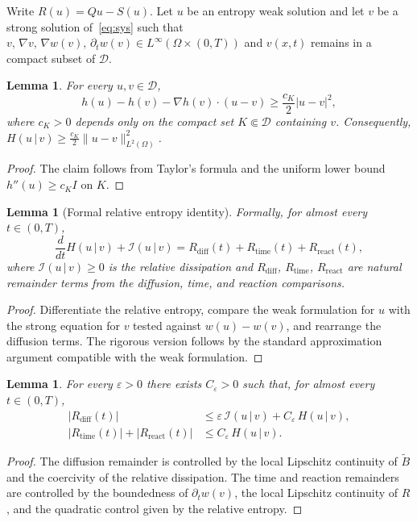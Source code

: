 \documentclass{article}
\newtheorem{lemma}[theorem]{Lemma}
\newcommand{\D}{\mathcal{D}}
\newcommand{\Be}{\widetilde{B}}       %
\newcommand{\norm}[1]{\lVert #1\rVert}
\begin{document}
Write $R(u)=Qu-S(u)$. Let $u$ be an entropy weak solution and let $v$
be a strong solution of~\eqref{eq:sys} such that
$v,\,\nabla v,\,\nabla w(v),\,\partial_t w(v)\in L^\infty(\Omega\times(0,T))$
and $v(x,t)$ remains in a compact subset of $\D$.

\begin{lemma}\label{lem:relent_coer}
For every $u,v\in\D$,
\[
  h(u)-h(v)-\nabla h(v)\cdot(u-v) \ge \frac{c_K}{2}|u-v|^2,
\]
where $c_K>0$ depends only on the compact set $K\Subset\D$ containing $v$.
Consequently, $H(u\,|\,v)\ge \frac{c_K}{2}\norm{u-v}^2_{L^2(\Omega)}$.
\end{lemma}

\begin{proof}
The claim follows from Taylor's formula and the uniform lower bound
$h''(u)\ge c_K I$ on $K$.
\end{proof}

\begin{lemma}[Formal relative entropy identity]\label{lem:relent_id}
Formally, for almost every $t\in(0,T)$,
\[
  \frac{d}{dt}H(u\,|\,v)
  + \mathcal{I}(u\,|\,v)
  = R_{\mathrm{diff}}(t) + R_{\mathrm{time}}(t) + R_{\mathrm{react}}(t),
\]
where $\mathcal{I}(u\,|\,v)\ge 0$ is the relative dissipation and
$R_{\mathrm{diff}}$, $R_{\mathrm{time}}$, $R_{\mathrm{react}}$ are
natural remainder terms from the diffusion, time, and reaction
comparisons.
\end{lemma}

\begin{proof}
Differentiate the relative entropy, compare the weak formulation for $u$
with the strong equation for $v$ tested against $w(u)-w(v)$, and
rearrange the diffusion terms. The rigorous version follows by the
standard approximation argument compatible with the weak formulation.
\end{proof}

\begin{lemma}\label{lem:relent_bounds}
For every $\varepsilon>0$ there exists $C_\varepsilon>0$ such that, for
almost every $t\in(0,T)$,
\begin{align*}
  |R_{\mathrm{diff}}(t)| &\le \varepsilon\,\mathcal{I}(u\,|\,v)
    + C_\varepsilon\,H(u\,|\,v), \\
  |R_{\mathrm{time}}(t)| + |R_{\mathrm{react}}(t)|
    &\le C_\varepsilon\,H(u\,|\,v).
\end{align*}
\end{lemma}

\begin{proof}
The diffusion remainder is controlled by the local Lipschitz continuity
of $\Be$ and the coercivity of the relative dissipation. The time and
reaction remainders are controlled by the boundedness of $\partial_t w(v)$,
the local Lipschitz continuity of $R$, and the quadratic control given
by the relative entropy.
\end{proof}
\end{document}
